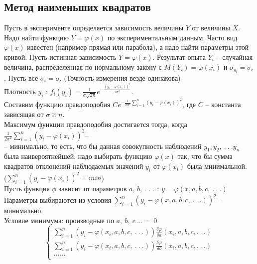 \documentclass[russian, 12pt, fleqn]{article}
\begin{document}
\subsection{Метод наименьших квадратов}
Пусть в эксперименте определяется зависимость величины $Y$ от величины $X$. Надо найти функцию $Y=\varphi(x)$ по экспериментальным данным. Часто вид $\varphi(x)$ известен (например прямая или парабола), а надо найти параметры этой кривой. Пусть истинная зависимость $Y = \varphi(x)$. Результат опыта $Y_i$ -- случайная величина, распределённая по нормальному закону с $M(Y_i)=\varphi(x_i)$ и $\sigma_{y_i} = \sigma_i$. Пусть все $\sigma_i = \sigma$. (Точность измерения везде одинакова)\\
Плотность $y_i$ : $f_i(y_i) = \frac{1}{\sigma \sqrt{2\pi}} e^{-\frac{(y_i - \varphi(x_i))^2}{2\sigma^2}}$.\\
Составим функцию правдоподобия  $Ce^{-\frac{1}{2\sigma^2}\displaystyle{\sum \limits_{i = 1}^{n}} (y_i - \varphi(x_i))^2}$, где $C$ -- константа зависящая от $\sigma$ и $n$.\\
Максимум функции правдоподобия достигается тогда, когда $\frac{1}{2\sigma^2}\displaystyle{\sum \limits_{i = 1}^{n}} (y_i-\varphi(x_i))^2$--\\-- минимально, то есть, что бы данная совокупность наблюдений $y_1, y_2,\ .\ .\ .y_n$ была наивероятнейшей, надо выбирать функцию $\varphi(x)$ так, что бы сумма квадратов отклонений наблюдаемых значений $y_i$ от $\varphi(x_i)$ была минимальной.\\
 ($\displaystyle{\sum \limits_{i = 1}^{n}} (y_i - \varphi(x_i))^2 = min$)\\
Пусть функция $\phi$ зависит от параметров $a$, $b$, . . . : $y = \varphi(x, a, b, c, \ .\ .\ .)$\\
Параметры выбираются из условия $\displaystyle{\sum \limits_{i = 1}^{n}} (y_i - \varphi(x, a, b, c, \ .\ .\ .))^2$ -- минимально.\\
Условие минимума: производные по $a,\ b,\ c\ ...=\ 0$
\\
\begin{equation*} 
 \begin{cases}
   \displaystyle{\sum \limits_{i = 1}^{n}} (y_i -  \varphi(x_i, a, b, c,\ .\ .\ .))\frac{\delta \varphi}{\delta a}(x_i, a, b, c, .\ .\ . ) \\
   \displaystyle{\sum \limits_{i = 1}^{n}} (y_i -  \varphi(x_i, a, b, c,\ .\ .\ .))\frac{\delta \varphi}{\delta b}(x_i, a, b, c, .\ .\ . ) \\
   ......\\
 \end{cases}
\end{equation*}
\end{document}
